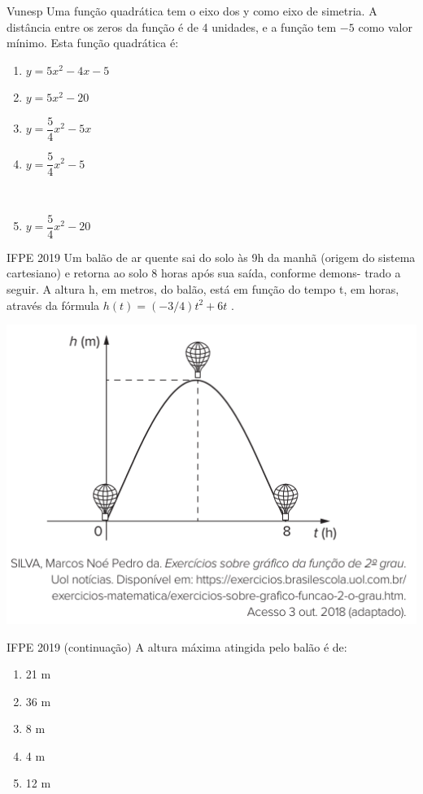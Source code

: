 \documentclass[11pt]{beamer}
\newif\ifgab
\newcommand{\gab}[1]{%
  \ifgab
    \textcolor{red!80!black}{\textbf{#1}}%
  \else
    #1%
  \fi
}
\begin{document}
\begin{frame}{Vunesp}
    Uma função quadrática tem o eixo dos y como eixo de simetria. A distância entre os zeros da função é de 4 unidades, e a função tem $-5$ como valor mínimo. Esta função quadrática é:

    \begin{enumerate}[a]
        \item $y=5x^{2}-4x-5$
        \item $y=5x^{2}-20$ \\
        \item $y=\dfrac{5}{4}x^{2}-5x$ \\
        \item \gab{$y=\dfrac{5}{4}x^{2}-5$} \\ %
        \item $y=\dfrac{5}{4}x^{2}-20$
    \end{enumerate}
\end{frame}

\begin{frame}{IFPE 2019}
    Um balão de ar quente sai do solo às 9h da manhã (origem do sistema cartesiano) e retorna ao solo 8 horas após sua saída, conforme demons- trado a seguir. A altura h, em metros, do balão, está em função do tempo t, em horas, através da fórmula $h(t)=(-{3}/{4})t^{2}+6t$ .

    \begin{center}
        \includegraphics[scale=0.5]{imagens/IFPE 2019.png}
    \end{center}
\end{frame}

\begin{frame}{IFPE 2019 (continuação)}
    A altura máxima atingida pelo balão é de:

    \begin{enumerate}[a]
        \item 21 m 
        \item 36 m
        \item 8 m 
        \item 4 m
        \item \gab{12 m} %
    \end{enumerate}
\end{frame}
\end{document}
